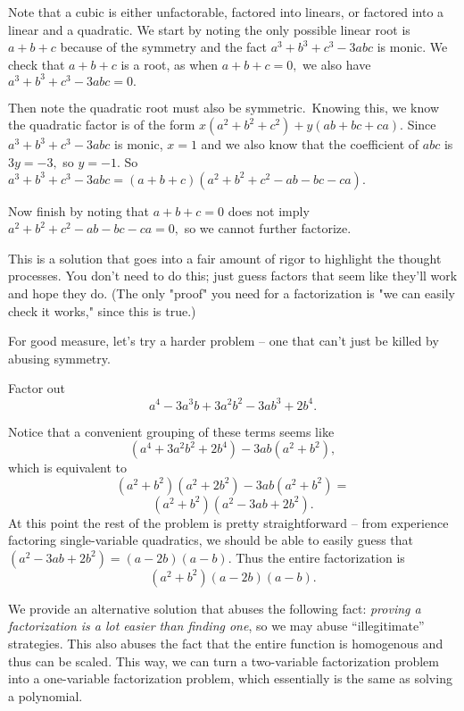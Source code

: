 \documentclass[mast]{lucky}
\begin{document}
\begin{sol}
Note that a cubic is either unfactorable, factored into linears, or factored into a linear and a quadratic. We start by noting the only possible linear root is $a+b+c$ because of the symmetry and the fact $a^3+b^3+c^3-3abc$ is monic. We check that $a+b+c$ is a root, as when $a+b+c=0,$ we also have $a^3+b^3+c^3-3abc=0.$

Then note the quadratic root must also be symmetric.\footnotemark\, Knowing this, we know the quadratic factor is of the form $x(a^2+b^2+c^2)+y(ab+bc+ca).$ Since $a^3+b^3+c^3-3abc$ is monic, $x=1$ and we also know that the coefficient of $abc$ is $3y=-3,$ so $y=-1.$ So $a^3+b^3+c^3-3abc=(a+b+c)(a^2+b^2+c^2-ab-bc-ca).$

Now finish by noting that $a+b+c=0$ does not imply $a^2+b^2+c^2-ab-bc-ca=0,$ so we cannot further factorize.
\end{sol}
This is a solution that goes into a fair amount of rigor to highlight the thought processes. You don't need to do this; just guess factors that seem like they'll work and hope they do. (The only "proof" you need for a factorization is "we can easily check it works," since this is true.)

For good measure, let's try a harder problem -- one that can't just be killed by abusing symmetry.

\begin{exam}
Factor out
\[a^4-3a^3b+3a^2b^2-3ab^3+2b^4.\]
\end{exam}

\begin{sol}[1]
Notice that a convenient grouping of these terms seems like
\[(a^4+3a^2b^2+2b^4)-3ab(a^2+b^2),\]
which is equivalent to
\[(a^2+b^2)(a^2+2b^2)-3ab(a^2+b^2)=\]
\[(a^2+b^2)(a^2-3ab+2b^2).\]
At this point the rest of the problem is pretty straightforward -- from experience factoring single-variable quadratics, we should be able to easily guess that $(a^2-3ab+2b^2)=(a-2b)(a-b).$ Thus the entire factorization is
\[(a^2+b^2)(a-2b)(a-b).\]
\end{sol}

We provide an alternative solution that abuses the following fact: \emph{proving a factorization is a lot easier than finding one}, so we may abuse ``illegitimate'' strategies. This also abuses the fact that the entire function is homogenous and thus can be scaled. This way, we can turn a two-variable factorization problem into a one-variable factorization problem, which essentially is the same as solving a polynomial.
\end{document}
